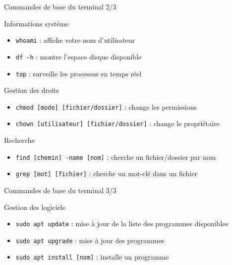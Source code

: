\documentclass[aspectratio=169,xcolor=dvipsnames]{beamer}
\begin{document}

\begin{frame}{Commandes de base du terminal 2/3}

    Informations système
    \begin{itemize}
        \item \texttt{whoami} : affiche votre nom d'utilisateur
        \item \texttt{df -h} : montre l'espace disque disponible
        \item \texttt{top} : surveille les processus en temps réel
    \end{itemize}

    Gestion des droits
    \begin{itemize}
        \item \texttt{chmod [mode] [fichier/dossier]} : change les permissions
        \item \texttt{chown [utilisateur] [fichier/dossier]} : change le propriétaire
    \end{itemize}
    
Recherche
    \begin{itemize}
        \item \texttt{find [chemin] -name [nom]} : cherche un fichier/dossier par nom
        \item \texttt{grep [mot] [fichier]} : cherche un mot-clé dans un fichier
    \end{itemize}
    
\end{frame}


\begin{frame}{Commandes de base du terminal 3/3}

    Gestion des logiciels
    \begin{itemize}
        \item \texttt{sudo apt update} : mise à jour de la liste des programmes disponibles
        \item \texttt{sudo apt upgrade} : mise à jour des programmes
        \item \texttt{sudo apt install [nom]} : installe un programme
    \end{itemize}
    
\end{frame}

\end{document}
